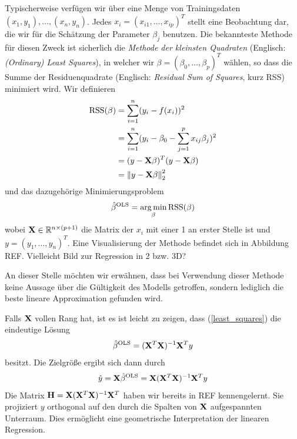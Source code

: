 Typischerweise verfügen wir über eine Menge von Trainingsdaten $(x_1, y_1), \ldots, (x_n, y_n)$. Jedes $x_i = (x_{i1}, \ldots, x_{ip})^T$ stellt eine Beobachtung dar, die wir für die Schätzung der Parameter $\beta_j$ benutzen. Die bekannteste Methode für diesen Zweck ist sicherlich die \textit{Methode der kleinsten Quadraten} (Englisch: \textit{(Ordinary) Least Squares}), in welcher wir $\beta = (\beta_0, \ldots, \beta_p)^T$ wählen, so dass die Summe der Residuenquadrate (Englisch: \textit{Residual Sum of Squares}, kurz RSS) minimiert wird. Wir definieren
\begin{align}
\label{RSS}
\text{RSS}(\beta) & = \sum_{i=1}^{n}(y_i - f(x_i))^2\\
& = \sum_{i=1}^{n}(y_i - \beta_0 - \sum_{j=1}^p x_{ij}\beta_j)^2\\
& = (y - \mathbf{X} \beta)^T(y-\mathbf{X} \beta)\\
& = \left\lVert y - \mathbf{X} \beta \right\rVert_{2}^{2}
\end{align}
und das dazugehörige Minimierungsproblem
\begin{align}
\label{least_squares}
\hat{\beta}^{\text{OLS}} = \operatorname*{arg\,min}_{\beta} \text{RSS}(\beta)
\end{align}
wobei $\mathbf{X} \in \mathbb{R}^{n \times (p+1)}$ die Matrix der $x_i$ mit einer 1 an erster Stelle ist und $y = (y_1, \ldots, y_n)^T$. Eine Visualisierung der Methode befindet sich in Abbildung REF. Vielleicht Bild zur Regression in 2 bzw. 3D?

An dieser Stelle möchten wir erwähnen, dass bei Verwendung dieser Methode keine Aussage über die Gültigkeit des Modells getroffen, sondern lediglich die beste lineare Approximation gefunden wird.

Falls $\mathbf{X}$ vollen Rang hat, ist es ist leicht zu zeigen, dass (\ref{least_squares}) die eindeutige Lösung
\begin{align}
\hat{\beta}^{\text{OLS}} = (\mathbf{X}^T\mathbf{X})^{-1}\mathbf{X}^T y
\end{align}
besitzt. Die Zielgröße ergibt sich dann durch
\begin{align}
\hat{y} = \mathbf{X} \hat{\beta}^{\text{OLS}} = \mathbf{X} (\mathbf{X}^T\mathbf{X})^{-1}\mathbf{X}^T y
\end{align}
Die Matrix $\mathbf{H} = \mathbf{X} (\mathbf{X}^T\mathbf{X})^{-1}\mathbf{X}^T$ haben wir bereits in REF kennengelernt. Sie projiziert $y$ orthogonal auf den durch  die Spalten von $\mathbf{X}$ aufgespannten Unterraum. Dies ermöglicht eine geometrische Interpretation der linearen Regression.

